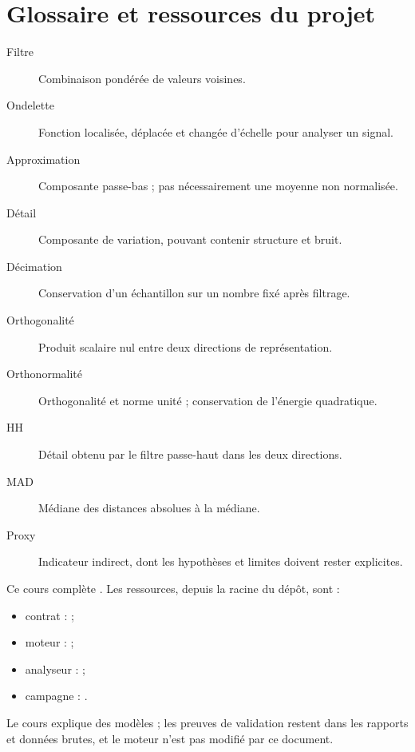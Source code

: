\section{Glossaire et ressources du projet}
\begin{description}
\item[Filtre] Combinaison pondérée de valeurs voisines.
\item[Ondelette] Fonction localisée, déplacée et changée d'échelle pour analyser un signal.
\item[Approximation] Composante passe-bas ; pas nécessairement une moyenne non normalisée.
\item[Détail] Composante de variation, pouvant contenir structure et bruit.
\item[Décimation] Conservation d'un échantillon sur un nombre fixé après filtrage.
\item[Orthogonalité] Produit scalaire nul entre deux directions de représentation.
\item[Orthonormalité] Orthogonalité et norme unité ; conservation de l'énergie quadratique.
\item[HH] Détail obtenu par le filtre passe-haut dans les deux directions.
\item[MAD] Médiane des distances absolues à la médiane.
\item[Proxy] Indicateur indirect, dont les hypothèses et limites doivent rester explicites.
\end{description}
Ce cours complète .
Les ressources, depuis la racine du dépôt, sont :
\begin{itemize}
\item contrat :  ;
\item moteur :  ;
\item analyseur :  ;
\item campagne : .
\end{itemize}
Le cours explique des modèles ; les preuves de validation restent dans
les rapports et données brutes, et le moteur n'est pas modifié par ce document.



\begingroup\raggedright\endgroup

